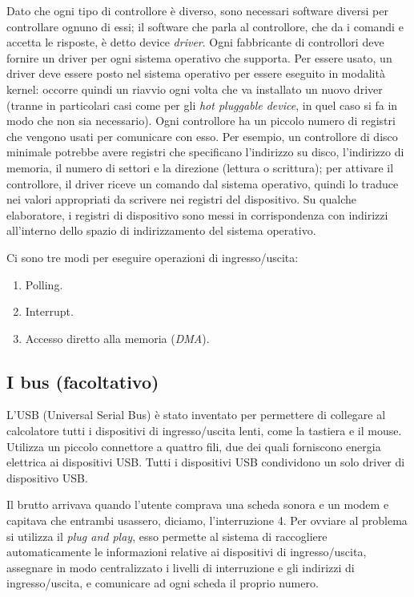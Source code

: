 Dato che ogni tipo di controllore è diverso, sono necessari software diversi per controllare ognuno di essi; il software che parla al controllore, che da i comandi e accetta le risposte, è detto device \textit{driver}. Ogni fabbricante di controllori deve fornire un driver per ogni sistema operativo che supporta. Per essere usato, un driver deve essere posto nel sistema operativo per essere eseguito in modalità kernel: occorre quindi un riavvio ogni volta che va installato un nuovo driver (tranne in particolari casi come per gli \textit{hot pluggable device}, in quel caso si fa in modo che non sia necessario). Ogni controllore ha un piccolo numero di registri che vengono usati per comunicare con esso. Per esempio, un controllore di disco minimale potrebbe avere registri che specificano l'indirizzo su disco, l'indirizzo di memoria, il numero di settori e la direzione (lettura o scrittura); per attivare il controllore, il driver riceve un comando dal sistema operativo, quindi lo traduce nei valori appropriati da scrivere nei registri del dispositivo.
Su qualche elaboratore, i registri di dispositivo sono messi in corrispondenza con indirizzi all'interno dello spazio di indirizzamento del sistema operativo.

Ci sono tre modi per eseguire operazioni di ingresso/uscita:
\begin{enumerate}
    \item Polling.
    \item Interrupt.
    \item Accesso diretto alla memoria (\textit{DMA}).
\end{enumerate}

\subsection{I bus (facoltativo)}

 L'USB (Universal Serial Bus) è stato inventato per permettere di collegare al calcolatore tutti i dispositivi di ingresso/uscita lenti, come la tastiera e il mouse. Utilizza un piccolo connettore a quattro fili, due dei quali forniscono energia elettrica ai dispositivi USB. Tutti i dispositivi USB condividono un solo driver di dispositivo USB.

 Il brutto arrivava quando l'utente comprava una scheda sonora e un modem e capitava che entrambi usassero, diciamo, l'interruzione 4. Per ovviare al problema si utilizza il \textit{plug and play}, esso permette al sistema di raccogliere automaticamente le informazioni relative ai dispositivi di ingresso/uscita, assegnare in modo centralizzato i livelli di interruzione e gli indirizzi di ingresso/uscita, e comunicare ad ogni scheda il proprio numero. 
 
